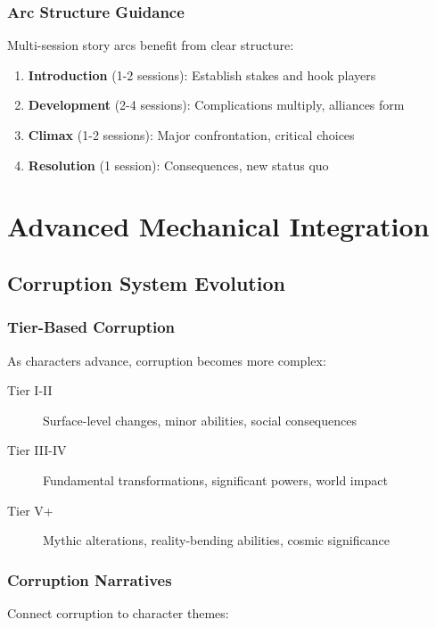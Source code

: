 \documentclass[11pt]{article}
\begin{document}
\subsubsection{Arc Structure Guidance}

Multi-session story arcs benefit from clear structure:

\begin{enumerate}
  \item \textbf{Introduction} (1-2 sessions): Establish stakes and hook players
  \item \textbf{Development} (2-4 sessions): Complications multiply, alliances form
  \item \textbf{Climax} (1-2 sessions): Major confrontation, critical choices
  \item \textbf{Resolution} (1 session): Consequences, new status quo
\end{enumerate}

\section{Advanced Mechanical Integration}

\subsection{Corruption System Evolution}

\subsubsection{Tier-Based Corruption}

As characters advance, corruption becomes more complex:

\begin{description}
  \item[Tier I-II] Surface-level changes, minor abilities, social consequences
  \item[Tier III-IV] Fundamental transformations, significant powers, world impact
  \item[Tier V+] Mythic alterations, reality-bending abilities, cosmic significance
\end{description}

\subsubsection{Corruption Narratives}

Connect corruption to character themes:
\end{document}

